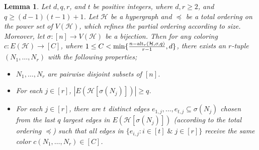 \documentclass[11pt]{amsart}
\newtheorem{lemma}{Lemma}
\theoremstyle{definition}
\theoremstyle{remark}
\begin{document}
\begin{lemma}\label{lem:main}
Let $d,q,r$, and $t$ be positive integers, where $d,r\geq 2$, and  $q\geq (d-1)(t-1)+1$.
Let $\mathcal{H}$ be a hypergraph and $\preceq$ be a total ordering on the power set 
of $V(\mathcal{H})$, which refines the partial ordering according to size.
Moreover, let $\sigma: [n]\longrightarrow V(\mathcal{H})$ be a bijection.
Then for any coloring  $c:E(\mathcal{H})\longrightarrow [C]$, where 
$1\leq C<\min\{{n-{\rm alt}_r(\mathcal{H},\sigma,q)\over r-1},d\}$, there 
exists an $r$-tuple $(N_1,\ldots,N_r)$ with the following properties; 
\begin{itemize}
\item $N_1,\ldots,N_r$ are pairwise disjoint subsets of $[n]$.
\item For each $j\in[r]$, $|E(\mathcal{H}[\sigma(N_j)])|\geq q$.
\item For each $j\in[r]$, there are $t$ distinct edges $e_{1,j},\ldots,e_{t,j}\subseteq \sigma(N_j)$ chosen from the last $q$ largest 
edges in  $E(\mathcal{H}[\sigma(N_j)])$ {\rm (}according to the total ordering $\preceq${\rm )} such that all edges in $\{e_{i,j}:i\in[t]\;\&\; j\in[r]\}$ receive the same color $c(N_1,\ldots,N_r)\in[C]$.
\end{itemize}
\end{lemma}
\end{document}
